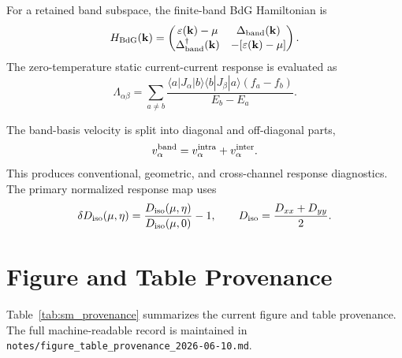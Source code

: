 \documentclass[aps,prb,preprint,superscriptaddress,floatfix,nofootinbib]{revtex4-2}
\newcommand{\code}[1]{\texttt{#1}}
\begin{document}
For a retained band subspace, the finite-band BdG Hamiltonian is
\begin{equation}
  H_{\rm BdG}(\mathbf{k}) =
  \begin{pmatrix}
  \varepsilon(\mathbf{k})-\mu & \Delta_{\rm band}(\mathbf{k})\\
  \Delta^\dagger_{\rm band}(\mathbf{k}) & -[\varepsilon(\mathbf{k})-\mu]
  \end{pmatrix}.
\end{equation}
The zero-temperature static current-current response is evaluated as
\begin{equation}
  \Lambda_{\alpha\beta}
  =
  \sum_{a\ne b}
  \frac{
  \langle a|J_\alpha|b\rangle
  \langle b|J_\beta|a\rangle
  (f_a-f_b)}
  {E_b-E_a}.
\end{equation}

The band-basis velocity is split into diagonal and off-diagonal parts,
\begin{equation}
  v_\alpha^{\rm band}
  =
  v_\alpha^{\rm intra}+v_\alpha^{\rm inter}.
\end{equation}
This produces conventional, geometric, and cross-channel response diagnostics.
The primary normalized response map uses
\begin{equation}
  \delta D_{\rm iso}(\mu,\eta)
  =
  \frac{D_{\rm iso}(\mu,\eta)}
       {D_{\rm iso}(\mu,0)} - 1,
  \qquad
  D_{\rm iso}=\frac{D_{xx}+D_{yy}}{2}.
\end{equation}

\section{Figure and Table Provenance}

Table~\ref{tab:sm_provenance} summarizes the current figure and table
provenance.  The full machine-readable record is maintained in
\code{notes/figure\_table\_provenance\_2026-06-10.md}.
\end{document}
